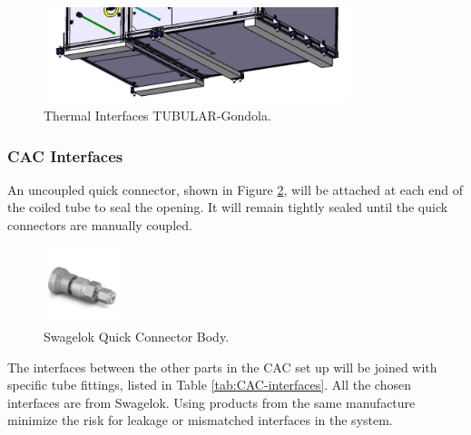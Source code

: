 \documentclass[a4paper,12pt,twoside]{article}
\begin{document}
\begin{figure}[H]
    \centering
    \includegraphics[width=0.8\textwidth]{4-experiment-design/img/Mechanical/thermal_interfaces.jpg}
    \caption{Thermal Interfaces TUBULAR-Gondola.}
    \label{fig:thermal_interface}
\end{figure}

\subsubsection{CAC Interfaces}
An uncoupled quick connector, shown in Figure \ref{fig:Quick-connector-body}, will be attached at each end of the coiled tube to seal the opening. It will remain tightly sealed until the quick connectors are manually coupled. 

\begin{figure}[H]
    \centering
    \includegraphics[width=0.2\textwidth]{4-experiment-design/img/Mechanical/CAC-QC-Outlet.jpg}
    \caption{Swagelok Quick Connector Body.}
    \label{fig:Quick-connector-body}
\end{figure}

The interfaces between the other parts in the CAC set up will be joined with specific tube fittings, listed in Table \ref{tab:CAC-interfaces}. All the chosen interfaces are from Swagelok. Using products from the same manufacture minimize the risk for leakage or mismatched interfaces in the system. 
\end{document}
